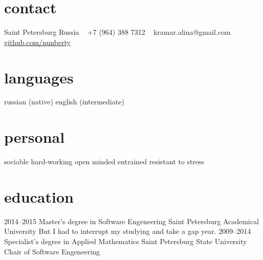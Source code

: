 \documentclass[]{friggeri-cv} %
\begin{document}


\begin{aside} %
\section{contact}
Saint Petersburg
Russia
~
+7 (964) 388 7312
~
kramar.alina@gmail.com
\href{https://github.com/nunberty}{github.com/nunberty}
\section{languages}
russian (native)
english (intermediate)
\section{personal}
sociable
hard-working
open minded
entrained
resistant to stress
\end{aside}

\section{education}

\begin{entrylist}
\entry
{2014--2015}
{Master's degree {\normalfont in Software Engeneering}}
{Saint Petersburg Academical University}
{But I had to interrupt my studying and take a gap year.}
{}
\entry
{2009--2014}
{Specialist's degree {\normalfont in Applied Mathematics}}
{Saint Petersburg State University}
{Chair of Software Engeneering}
\end{entrylist}

\end{document}
